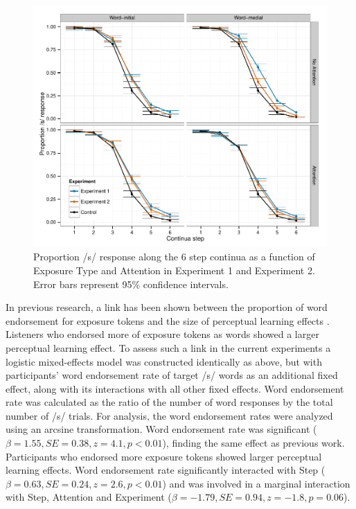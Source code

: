 \begin{figure}[!ht]
\caption{Proportion /s/ response along the 6 step continua as a function of Exposure Type and Attention in Experiment 1 and Experiment 2. Error bars represent 95\% confidence intervals.}
\label{fig:exp12categ}
\begin{center}
\includegraphics[width=\textwidth]{graphs/exp12_categresults}
\end{center}
\end{figure}

In previous research, a link has been shown between the proportion of word endorsement for exposure tokens and the size of perceptual learning effects \citep{Scharenborg2013}.
Listeners who endorsed more of exposure tokens as words showed a larger perceptual learning effect.
To assess such a link in the current experiments a logistic mixed-effects model was constructed identically as above, but with participants' word endorsement rate of target /s/ words as an additional fixed effect, along with its interactions with all other fixed effects.
Word endorsement rate was calculated as the ratio of the number of word responses by the total number of /s/ trials.
For analysis, the word endorsement rates were analyzed using an arcsine transformation.
Word endorsement rate was significant ($\beta = 1.55, SE = 0.38, z = 4.1, p < 0.01$), finding the same effect as previous work.
Participants who endorsed more exposure tokens showed larger perceptual learning effects.
Word endorsement rate significantly interacted with Step ($\beta = 0.63, SE = 0.24, z = 2.6, p < 0.01$) and was involved in a marginal  interaction with Step, Attention and Experiment ($\beta = -1.79, SE = 0.94, z = -1.8, p = 0.06$).

